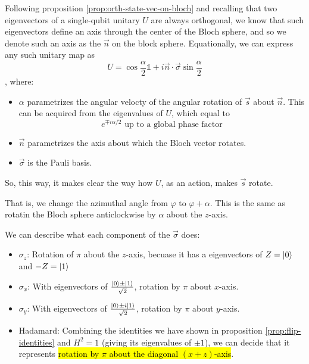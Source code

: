 \documentclass[12pt]{article}
\begin{document}
\begin{proposition}
Following proposition \ref{prop:orth-state-vec-on-bloch} and recalling that two eigenvectors of a single-qubit unitary $U$ are always orthogonal, we know that such eigenvectors define an axis through the center of the Bloch sphere, and so we denote such an axis as the $\vec{n}$ on the block sphere. Equationally, we can express any such unitary map as $$
U = \cos\frac{\alpha}{2} \mathbb{1} + i\vec{n}\cdot \vec{\sigma} \sin\frac{\alpha}{2}
$$, where:
\begin{itemize}
    \item $\alpha$ parametrizes the angular velocty of the angular rotation of $\vec{s}$ about $\vec{n}$. This can be acquired from the eigenvalues of $U$, which equal to $$
    e^{\mp i\alpha/2}\text{ up to a global phase factor}
    $$
    \item $\vec{n}$ parametrizes the axis about which the Bloch vector rotates.
    \item $\vec{\sigma}$ is the Pauli basis.
\end{itemize}
So, this way, it makes clear the way how $U$, as an action, makes $\vec{s}$ rotate.
\end{proposition}

\begin{example}[$P_\alpha\prt{\cos\frac{\theta}{2}\Ket{0} + e^{i\varphi}\sin\frac{\theta}{2}\Ket{1}} = \cos\frac{\theta}{2}\Ket{0} + e^{i(\varphi + \alpha)}\sin\frac{\theta}{2}\Ket{1}$]
That is, we change the azimuthal angle from $\varphi$ to $\varphi + \alpha$. This is the same as rotatin the Bloch sphere anticlockwise by $\alpha$ about the $z$-axis.
\end{example}

\begin{example}[$\vec{\sigma}$]
We can describe what each component of the $\vec{\sigma}$ does:
\begin{itemize}
    \item $\sigma_z$: Rotation of $\pi$ about the $z$-axis, becuase it has a eigenvectors of $Z = \Ket{0}$ and $-Z = \Ket{1}$
    \item $\sigma_x$: With eigenvectors of $\frac{\Ket{0} \pm \Ket{1}}{\sqrt{2}}$, rotation by $\pi$ about $x$-axis.
    \item $\sigma_y$: With eigenvectors of $\frac{\Ket{0} \pm i\Ket{1}}{\sqrt{2}}$, rotation by $\pi$ about $y$-axis.
    \item Hadamard: Combining the identities we have shown in proposition \ref{prop:flip-identities} and $H^2 = 1$ (giving its eigenvalues of $\pm1$), we can decide that it represents \hl{rotation by $\pi$ about the diagonal $(x+z)$-axis}.
\end{itemize}
\end{example}
\end{document}
